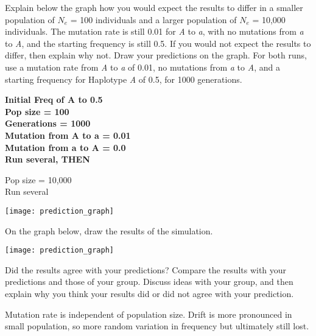 \documentclass[11pt, addpoints]{exam}
\begin{document}
\begin{questions}
\question[2]
Explain below the graph how you would expect the results to
differ in a smaller population of $N_e$ = 100
individuals and a larger population of $N_e$ =
10,000 individuals. The mutation rate is still 0.01 for \textit{A} to
\textit{a}, with no mutations from \textit{a} to \textit{A}, and the starting frequency is still
0.5. If you would not expect the results to differ, then
explain why not. Draw your predictions on the graph. 
For both runs, use a mutation rate from \emph{A} to \emph{a} of 0.01, no mutations from
\emph{a} to \emph{A}, and a starting frequency for Haplotype \emph{A} of
0.5, for 1000 generations.

\ifprintanswers
	{\bfseries 
	Initial Freq of A to 0.5\\
	Pop size = 100\\
	Generations = 1000\\
	Mutation from A to a = 0.01\\
	Mutation from a to A = 0.0\\
	Run several, THEN\vspace{\baselineskip}
	
	Pop size = 10,000\\
	Run several}\vspace{11\baselineskip}
\else
	\begin{center}
		\texttt{[image: prediction\_graph]}
	\end{center}
\fi

\newpage

\question
On the graph below, draw the results of the simulation.

\begin{center}
	\texttt{[image: prediction\_graph]}
\end{center}

\question
Did the results agree with your predictions? Compare the
results with your predictions and those of your group. Discuss ideas
with your group, and then explain why you think your results did or did
not agree with your prediction.

\begin{solution}
Mutation rate is independent of population size. Drift is more pronounced in small population, so more random variation in frequency but ultimately still lost.
\end{solution}

\newpage


\end{questions}
\end{document}
